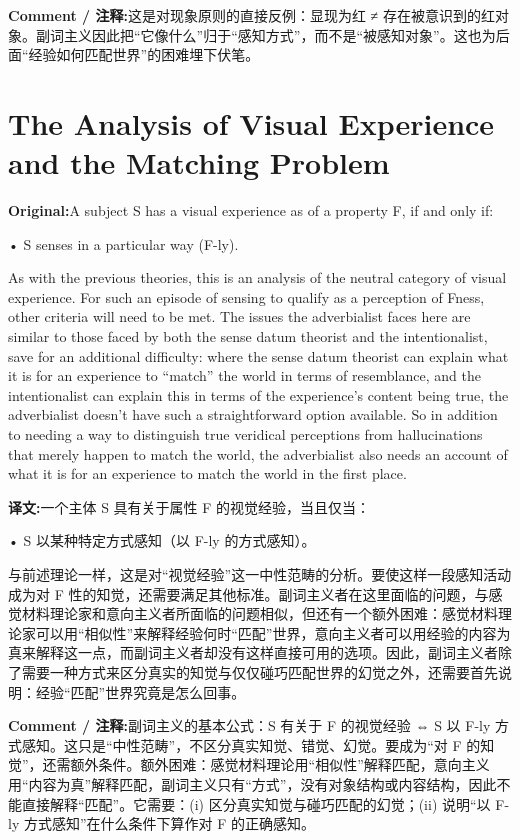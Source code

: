 \documentclass[11pt,a4paper]{article}
\newcommand{\eng}[1]{\begin{engbox}\noindent\textbf{Original:}\quad #1\end{engbox}}
\newcommand{\cn}[1]{\begin{cnbox}\noindent\textbf{译文:}\quad #1\end{cnbox}}
\newcommand{\cmt}[1]{\begin{commentbox}\noindent\textbf{Comment / 注释:}\quad #1\end{commentbox}}
\begin{document}
\cmt{这是对现象原则的直接反例：显现为红 ≠ 存在被意识到的红对象。副词主义因此把“它像什么”归于“感知方式”，而不是“被感知对象”。这也为后面“经验如何匹配世界”的困难埋下伏笔。}

\section{The Analysis of Visual Experience and the Matching Problem}

\eng{A subject S has a visual experience as of a property F, if and only if:

• S senses in a particular way (F-ly).

As with the previous theories, this is an analysis of the neutral category of visual experience. For such an episode of sensing to qualify as a perception of Fness, other criteria will need to be met. The issues the adverbialist faces here are similar to those faced by both the sense datum theorist and the intentionalist, save for an additional difficulty: where the sense datum theorist can explain what it is for an experience to “match” the world in terms of resemblance, and the intentionalist can explain this in terms of the experience’s content being true, the adverbialist doesn’t have such a straightforward option available. So in addition to needing a way to distinguish true veridical perceptions from hallucinations that merely happen to match the world, the adverbialist also needs an account of what it is for an experience to match the world in the first place.}

\cn{一个主体 S 具有关于属性 F 的视觉经验，当且仅当：

• S 以某种特定方式感知（以 F-ly 的方式感知）。

与前述理论一样，这是对“视觉经验”这一中性范畴的分析。要使这样一段感知活动成为对 F 性的知觉，还需要满足其他标准。副词主义者在这里面临的问题，与感觉材料理论家和意向主义者所面临的问题相似，但还有一个额外困难：感觉材料理论家可以用“相似性”来解释经验何时“匹配”世界，意向主义者可以用经验的内容为真来解释这一点，而副词主义者却没有这样直接可用的选项。因此，副词主义者除了需要一种方式来区分真实的知觉与仅仅碰巧匹配世界的幻觉之外，还需要首先说明：经验“匹配”世界究竟是怎么回事。}

\cmt{副词主义的基本公式：S 有关于 F 的视觉经验 ⇔ S 以 F-ly 方式感知。这只是“中性范畴”，不区分真实知觉、错觉、幻觉。要成为“对 F 的知觉”，还需额外条件。额外困难：感觉材料理论用“相似性”解释匹配，意向主义用“内容为真”解释匹配，副词主义只有“方式”，没有对象结构或内容结构，因此不能直接解释“匹配”。它需要：(i) 区分真实知觉与碰巧匹配的幻觉；(ii) 说明“以 F-ly 方式感知”在什么条件下算作对 F 的正确感知。}
\end{document}

